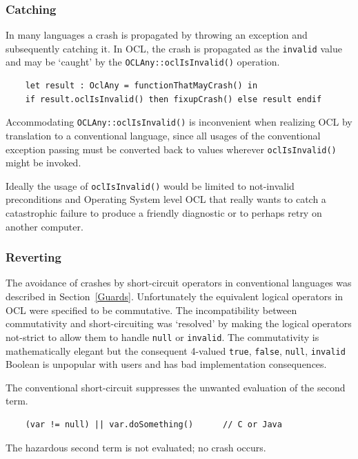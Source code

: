 \documentclass{llncs}
\begin{document}
\subsubsection{Catching}

In many languages a crash is propagated by throwing an exception and subsequently catching it. In OCL, the crash is propagated as the \verb|invalid| value and may be `caught' by the \verb|OCLAny::oclIsInvalid()| operation.

\begin{verbatim}
	let result : OclAny = functionThatMayCrash() in
	if result.oclIsInvalid() then fixupCrash() else result endif
\end{verbatim}

Accommodating \verb|OCLAny::oclIsInvalid()| is inconvenient when realizing OCL by translation to a conventional language, since all usages of the conventional exception passing must be converted back to values wherever \verb|oclIsInvalid()| might be invoked.

Ideally the usage of \verb|oclIsInvalid()| would be limited to not-invalid preconditions and Operating System level OCL that really wants to catch a catastrophic failure to produce a friendly diagnostic or to perhaps retry on another computer.

\subsubsection{Reverting}

The avoidance of crashes by short-circuit operators in conventional languages was described in Section~\ref{Guards}. Unfortunately the equivalent logical operators in OCL were  specified to be commutative. The incompatibility between commutativity and short-circuiting was `resolved' by making the logical operators not-strict to allow them to handle \verb|null| or \verb|invalid|. The commutativity is mathematically elegant but the consequent 4-valued {\verb|true|, \verb|false|, \verb|null|, \verb|invalid|} Boolean is unpopular with users and has bad implementation consequences.

The conventional short-circuit suppresses the unwanted evaluation of the second term.

\begin{verbatim}
	(var != null) || var.doSomething()		// C or Java
\end{verbatim}

The hazardous second term is not evaluated; no crash occurs.
\end{document}
